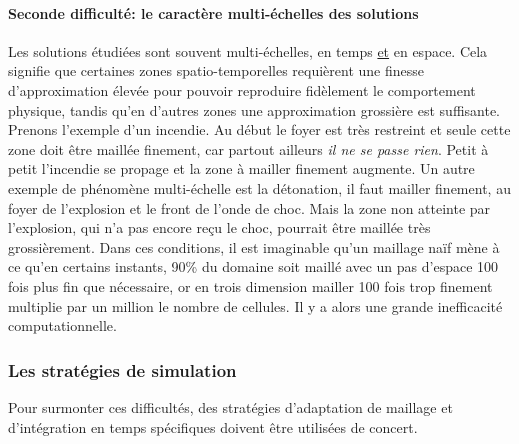     \paragraph{Seconde difficulté: le caractère multi-échelles des solutions}
        Les solutions étudiées sont souvent multi-échelles, en temps \underline{et} en espace. Cela signifie que certaines zones spatio-temporelles requièrent
        une finesse d'approximation élevée pour pouvoir reproduire fidèlement le comportement physique, tandis qu'en d'autres zones une approximation
        grossière est suffisante. Prenons l'exemple d'un incendie. Au début le foyer est très restreint et seule cette zone doit être maillée finement, 
        car partout ailleurs \textit{il ne se passe rien}. Petit à petit l'incendie se propage et la zone à mailler finement augmente. Un autre exemple de phénomène 
        multi-échelle est la détonation, il faut mailler finement, au foyer de l'explosion et le front de l'onde de choc. Mais la zone non atteinte par l'explosion, 
        qui n'a pas encore reçu le choc, pourrait être maillée très grossièrement. 
        Dans ces conditions, il est imaginable qu'un maillage naïf mène à ce qu'en certains instants, 90\% du domaine soit maillé avec un pas d'espace 100 fois plus fin que nécessaire,
        or en trois dimension mailler 100 fois trop finement multiplie par un million le nombre de cellules.
        Il y a alors une grande inefficacité computationnelle.


\subsubsection{Les stratégies de simulation}
    Pour surmonter ces difficultés, des stratégies d'adaptation de maillage et d'intégration en temps spécifiques doivent être utilisées de concert. 

